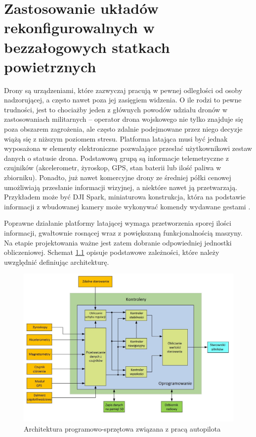 \chapter{Zastosowanie układów rekonfigurowalnych w bezzałogowych statkach powietrznych}

Drony są urządzeniami, które zazwyczaj pracują w pewnej odległości od osoby nadzorującej, a często nawet poza jej zasięgiem widzenia. O ile rodzi to pewne trudności, jest to chociażby jeden z głównych powodów udziału dronów w zastosowaniach militarnych -- operator drona wojskowego nie tylko znajduje się poza obszarem zagrożenia, ale często zdalnie podejmowane przez niego decyzje wiążą się z niższym poziomem stresu. Platforma latająca musi być jednak wyposażona w elementy elektroniczne pozwalające przesłać użytkownikowi zestaw danych o statusie drona. Podstawową grupą są informacje telemetryczne z czujników (akcelerometr, żyroskop, GPS, stan baterii lub ilość paliwa w zbiorniku). Ponadto, już nawet komercyjne drony ze średniej półki cenowej umożliwiają przesłanie informacji wizyjnej, a niektóre nawet ją przetwarzają. Przykładem może być DJI Spark, miniaturowa konstrukcja, która na podstawie informacji z wbudowanej kamery może wykonywać komendy wydawane gestami \cite{SPARK}.

Poprawne działanie platformy latającej wymaga przetworzenia sporej ilości informacji, gwałtownie rosnącej wraz z powiększaną funkcjonalnością maszyny. Na etapie projektowania ważne jest zatem dobranie odpowiedniej jednostki obliczeniowej. Schemat \ref{fig:autopilot_architecture} opisuje podstawowe zależności, które należy uwzględnić definiując architekturę.
\begin{figure}[h]
	\centering
	\includegraphics[width=12cm]{7_drone_platform_overview.jpg}
	\caption{Architektura programowo-sprzętowa związana z pracą autopilota \cite{Bouhali2017} }
	\label{fig:autopilot_architecture}
\end{figure} 

